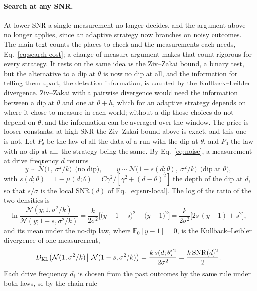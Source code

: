 \paragraph{Search at any SNR.} At lower SNR a single measurement no longer decides, and the argument above no longer
applies, since an adaptive strategy now branches on noisy outcomes. The main text counts the places to check and the
measurements each needs, Eq.~\eqref{eq:search-cost}; a change-of-measure argument \cite{garivier2019} makes that
count rigorous for every strategy. It rests on the same idea as the Ziv--Zakai bound, a binary test, but the
alternative to a dip at $\theta$ is now no dip at all, and the information for telling them apart, the detection information, is counted by the
Kullback--Leibler divergence. Ziv--Zakai with a pairwise divergence would need the information between a dip at $\theta$
and one at $\theta+h$, which for an adaptive strategy depends on where it chose to measure in each world; without a
dip those choices do not depend on $\theta$, and the information can be averaged over the window. The price is looser
constants: at high SNR the Ziv--Zakai bound above is exact, and this one is not. Let $P_\theta$ be the law of all the data of a run with the dip at $\theta$,
and $P_0$ the law with no dip at all, the strategy being the same. By Eq.~\eqref{eq:noise}, a measurement at drive
frequency $d$ returns
\begin{equation*}
  y\sim\mathcal N\big(1,\ \sigma^2/k\big)\ \ \text{(no dip)},\qquad
  y\sim\mathcal N\big(1-s(d;\theta),\ \sigma^2/k\big)\ \ \text{(dip at $\theta$)},
\end{equation*}
with $s(d;\theta)=1-\mu(d;\theta)=C\gamma^2/[\gamma^2+(d-\theta)^2]$ the depth of the dip at $d$, so that
$s/\sigma$ is the local $\mathrm{SNR}(d)$ of Eq.~\eqref{eq:snr-local}. The log of the ratio of the two densities is
\begin{equation*}
  \ln\frac{\mathcal N(y;1,\sigma^2/k)}{\mathcal N(y;1-s,\sigma^2/k)}
  =\frac{k}{2\sigma^2}\Big[\big(y-1+s\big)^2-\big(y-1\big)^2\Big]
  =\frac{k}{2\sigma^2}\Big[2s\,(y-1)+s^2\Big],
\end{equation*}
and its mean under the no-dip law, where $\mathbb E_0[y-1]=0$, is the Kullback--Leibler divergence of one
measurement,
\begin{equation*}
  D_{\rm KL}\big(\mathcal N(1,\sigma^2/k)\,\big\|\,\mathcal N(1-s,\sigma^2/k)\big)=\frac{k\,s(d;\theta)^2}{2\sigma^2}
  =\frac{k\,\mathrm{SNR}(d)^2}{2}.
\end{equation*}
Each drive frequency $d_i$ is chosen from the past outcomes by the same rule under both laws, so by the chain rule
